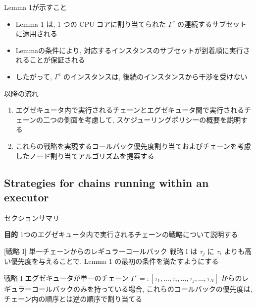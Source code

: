 \begin{frame}{Lemma 1が示すこと}
    \begin{itemize}
        \item Lemma 1 は, 1 つの CPU コアに割り当てられた $\Gamma^{c}$ の連続するサブセットに適用される
        \item Lemmaの条件により, 対応するインスタンスのサブセットが到着順に実行されることが保証される
        \item したがって, $\Gamma^{c}$ のインスタンスは, 後続のインスタンスから干渉を受けない
    \end{itemize}
\end{frame}

\begin{frame}{以降の流れ}
    \begin{enumerate}
        \item エグゼキュータ内で実行されるチェーンとエグゼキュータ間で実行されるチェーンの二つの側面を考慮して, スケジューリングポリシーの概要を説明する
        \item これらの戦略を実現するコールバック優先度割り当ておよびチェーンを考慮したノード割り当てアルゴリズムを提案する
    \end{enumerate}
\end{frame}


\subsection{Strategies for chains running within an executor}
\label{ssec: strategies for chains running within an executor}

\begin{frame}{セクションサマリ}
    \begin{itembox}[l]{\textbf{目的}}
        1つのエグゼキュータ内で実行されるチェーンの戦略について説明する
    \end{itembox}
\end{frame}

\begin{frame}{}
\end{frame}

\begin{frame}[label=strategy1]{[戦略 I] 単一チェーンからのレギュラーコールバック}
    戦略 I は $\tau_{j}$ に $\tau_{i}$ よりも高い優先度を与えることで, Lemma 1 の最初の条件を満たすようにする
    \begin{block}{戦略 I}
        エグゼキュータが単一のチェーン $\Gamma^{c}=:\left[\tau_{1}, \ldots, \tau_{i}, \ldots, \tau_{j}, \ldots, \tau_{N}\right]$ からのレギュラーコールバックのみを持っている場合, これらのコールバックの優先度は, チェーン内の順序とは逆の順序で割り当てる
    \end{block}
\end{frame}

